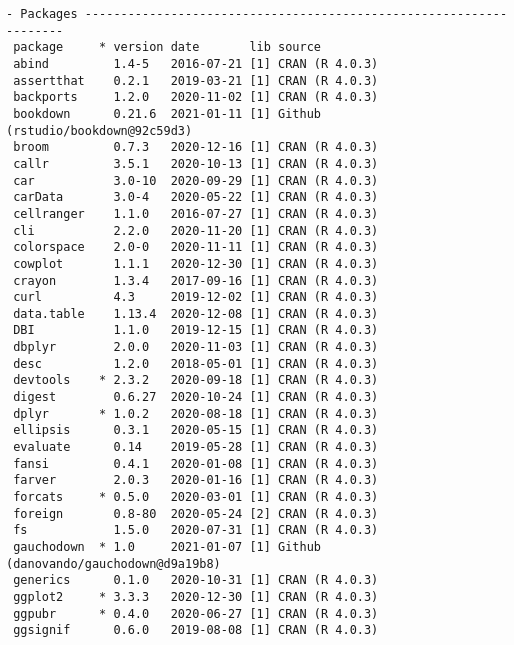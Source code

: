 \documentclass[twoside,12pt,final]{ucthesis-CA2012}
\begin{document}
\begin{ucmainmatter}
\begin{verbatim}
- Packages -------------------------------------------------------------------
 package     * version date       lib source                               
 abind         1.4-5   2016-07-21 [1] CRAN (R 4.0.3)                       
 assertthat    0.2.1   2019-03-21 [1] CRAN (R 4.0.3)                       
 backports     1.2.0   2020-11-02 [1] CRAN (R 4.0.3)                       
 bookdown      0.21.6  2021-01-11 [1] Github (rstudio/bookdown@92c59d3)    
 broom         0.7.3   2020-12-16 [1] CRAN (R 4.0.3)                       
 callr         3.5.1   2020-10-13 [1] CRAN (R 4.0.3)                       
 car           3.0-10  2020-09-29 [1] CRAN (R 4.0.3)                       
 carData       3.0-4   2020-05-22 [1] CRAN (R 4.0.3)                       
 cellranger    1.1.0   2016-07-27 [1] CRAN (R 4.0.3)                       
 cli           2.2.0   2020-11-20 [1] CRAN (R 4.0.3)                       
 colorspace    2.0-0   2020-11-11 [1] CRAN (R 4.0.3)                       
 cowplot       1.1.1   2020-12-30 [1] CRAN (R 4.0.3)                       
 crayon        1.3.4   2017-09-16 [1] CRAN (R 4.0.3)                       
 curl          4.3     2019-12-02 [1] CRAN (R 4.0.3)                       
 data.table    1.13.4  2020-12-08 [1] CRAN (R 4.0.3)                       
 DBI           1.1.0   2019-12-15 [1] CRAN (R 4.0.3)                       
 dbplyr        2.0.0   2020-11-03 [1] CRAN (R 4.0.3)                       
 desc          1.2.0   2018-05-01 [1] CRAN (R 4.0.3)                       
 devtools    * 2.3.2   2020-09-18 [1] CRAN (R 4.0.3)                       
 digest        0.6.27  2020-10-24 [1] CRAN (R 4.0.3)                       
 dplyr       * 1.0.2   2020-08-18 [1] CRAN (R 4.0.3)                       
 ellipsis      0.3.1   2020-05-15 [1] CRAN (R 4.0.3)                       
 evaluate      0.14    2019-05-28 [1] CRAN (R 4.0.3)                       
 fansi         0.4.1   2020-01-08 [1] CRAN (R 4.0.3)                       
 farver        2.0.3   2020-01-16 [1] CRAN (R 4.0.3)                       
 forcats     * 0.5.0   2020-03-01 [1] CRAN (R 4.0.3)                       
 foreign       0.8-80  2020-05-24 [2] CRAN (R 4.0.3)                       
 fs            1.5.0   2020-07-31 [1] CRAN (R 4.0.3)                       
 gauchodown  * 1.0     2021-01-07 [1] Github (danovando/gauchodown@d9a19b8)
 generics      0.1.0   2020-10-31 [1] CRAN (R 4.0.3)                       
 ggplot2     * 3.3.3   2020-12-30 [1] CRAN (R 4.0.3)                       
 ggpubr      * 0.4.0   2020-06-27 [1] CRAN (R 4.0.3)                       
 ggsignif      0.6.0   2019-08-08 [1] CRAN (R 4.0.3)                       

\end{verbatim}
\end{ucmainmatter}
\end{document}
